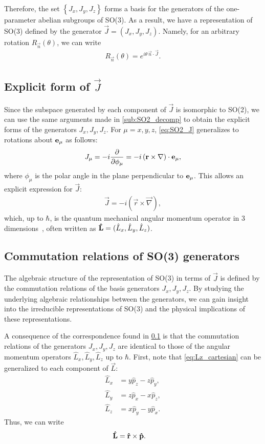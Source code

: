 Therefore, the set $\left\{ J_x,J_y,J_z \right\}$ forms a basis for the generators of the one-parameter abelian subgroups of SO(3). As a result, we have a representation of SO(3) defined by the generator $\vec{J} = (J_x,J_y,J_z)$. Namely, for an arbitrary rotation $R_{\vec{n}}(\theta)$, we can write
\begin{align*}
    R_{\vec{n}}(\theta) = e^{i\theta\,\vec{n}\cdot\vec{J}}.
\end{align*}

\subsection{Explicit form of $\vec{J}$}\label{sec:SO3_J}
Since the subspace generated by each component of $\vec{J}$ is isomorphic to SO(2), we can use the same arguments made in \cref{sub:SO2_decomp} to obtain the explicit forms of the generators $J_x,J_y,J_z$. For $\mu=x,y,z$, \cref{eq:SO2_J} generalizes to rotations about $\mathbf{e}_\mu$ as follows:
\begin{align*}
    J_\mu = -i \frac{\partial}{\partial\phi_\mu} = -i \left( \mathbf{r}\times\mathbf{\nabla} \right)\cdot\mathbf{e}_\mu,
\end{align*}
where $\phi_\mu$ is the polar angle in the plane perpendicular to $\mathbf{e}_\mu$. This allows an explicit expression for $\vec{J}$:
\begin{align}
    \vec{J} = -i \left( \vec{r}\times\vec{\nabla} \right),
\end{align}
which, up to $\hbar$, is the quantum mechanical angular momentum operator in 3 dimensions~\cite{Hall2013}, often written as $\mathbf{\hat{L}}=(\hat{L}_x,\hat{L}_y,\hat{L}_z)$.

\subsection{Commutation relations of SO(3) generators}\label{sub:SO3_comms}
The algebraic structure of the representation of SO(3) in terms of $\vec{J}$ is defined by the commutation relations of the basis generators $J_x,J_y,J_z$. By studying the underlying algebraic relationships between the generators, we can gain insight into the irreducible representations of SO(3) and the physical implications of these representations.

A consequence of the correspondence found in \cref{sec:SO3_J} is that the commutation relations of the generators $J_x,J_y,J_z$ are identical to those of the angular momentum operators $\hat{L}_x,\hat{L}_y,\hat{L}_z$ up to $\hbar$. First, note that \cref{eq:Lz_cartesian} can be generalized to each component of $\vec{L}$:
\begin{align}
    \hat{L}_x &= y \hat{p}_z - z \hat{p}_y, \\
    \hat{L}_y &= z \hat{p}_x - x \hat{p}_z, \\
    \hat{L}_z &= x \hat{p}_y - y \hat{p}_x.
\end{align}
Thus, we can write
\begin{align}
    \mathbf{\hat{L}} &= \mathbf{\hat{r}}\times\mathbf{\hat{p}}.
\end{align}

